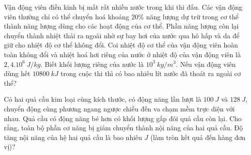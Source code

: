 \begin{ex}%
	Vận động viên điền kinh bị mất rất nhiều nước trong khi thi đấu. Các vận động viên thường chỉ có thể chuyển hoá khoảng $20\%$ năng lượng dự trữ trong cơ thể thành năng lượng dùng cho các hoạt động của cơ thể. Phần năng lượng còn lại chuyển thành nhiệt thải ra ngoài nhờ sự bay hơi của nước qua hô hấp và da để giữ cho nhiệt độ cơ thể không đổi. Coi nhiệt độ cơ thể của vận động viên hoàn toàn không đổi và nhiệt hoá hơi riêng của nước ở nhiệt độ của vận động viên là $2,4.10^{6}\ J/kg$. Biết khối lượng riêng của nước là $10^{3}\ kg/m^{3}$. Nếu vận động viên dùng hết $10800\ kJ$ trong cuộc thi thì có bao nhiêu lít nước đã thoát ra ngoài cơ thể?
\end{ex}

\begin{ex}%
	Có hai quả cầu kim loại cùng kích thước, có động năng lần lượt là $100\ J$ và $128\ J$, chuyển động cùng phương ngang ngược chiều đến va chạm mềm trực diện với nhau. Quả cầu có động năng bé hơn có khối lượng gấp đôi quả cầu còn lại. Cho rằng, toàn bộ phần cơ năng bị giảm chuyển thành nội năng của hai quả cầu. Độ tăng nội năng của hệ hai quả cầu là bao nhiêu $J$ (làm tròn kết quả đến hàng đơn vị)?
\end{ex}

